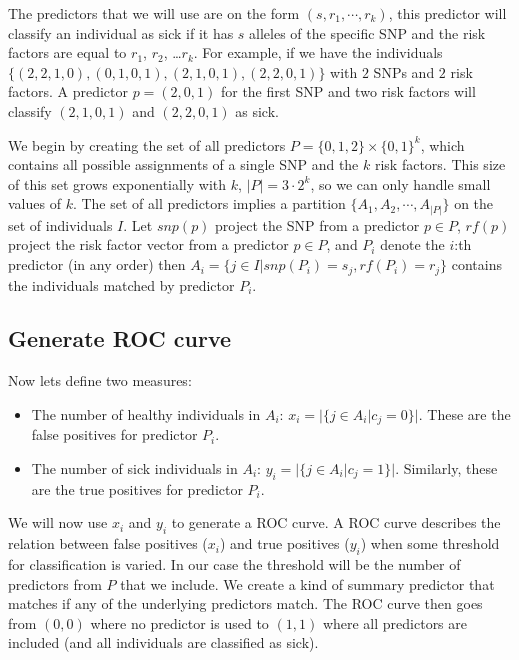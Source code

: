 \documentclass[a4paper]{article}
\begin{document}
The predictors that we will use are on the form $(s, r_1, \cdots, r_k)$, this predictor will classify an individual as sick if it has $s$ alleles of the specific SNP and the risk factors are equal to $r_1$, $r_2$, \ldots $r_k$. For example, if we have the individuals $\{(2,2,1,0),(0,1,0,1),(2,1,0,1),(2,2,0,1)\}$ with $2$ SNPs and $2$ risk factors. A predictor $p = (2,0,1)$ for the first SNP and two risk factors will classify $(2,1,0,1)$ and $(2,2,0,1)$ as sick.

We begin by creating the set of all predictors $P = \{0,1,2\}\times\{0,1\}^k$, which contains all possible assignments of a single SNP and the $k$ risk factors. This size of this set grows exponentially with $k$, $|P| = 3 \cdot 2^k$, so we can only handle small values of $k$. The set of all predictors implies a partition $\{A_1, A_2, \cdots, A_{|P|}\}$ on the set of individuals $I$. Let $snp(p)$ project the SNP from a predictor $p \in P$, $rf(p)$ project the risk factor vector from a predictor $p \in P$, and $P_i$ denote the $i$:th predictor (in any order) then $A_i = \{ j \in I | snp(P_i) = s_j, rf(P_i) = r_j \}$ contains the individuals matched by predictor $P_i$.
\subsection{Generate ROC curve}
Now lets define two measures:
\begin{itemize}
  \item The number of healthy individuals in $A_i$: $x_i = |\{j \in A_i | c_j = 0\}|$. These are the false positives for predictor $P_i$.
  \item The number of sick individuals in $A_i$: $y_i = |\{j \in A_i | c_j = 1\}|$. Similarly, these are the true positives for predictor $P_i$.
\end{itemize}
We will now use $x_i$ and $y_i$ to generate a ROC curve. A ROC curve describes the relation between false positives ($x_i$) and true positives ($y_i$) when some threshold for classification is varied. In our case the threshold will be the number of predictors from $P$ that we include. We create a kind of summary predictor that matches if any of the underlying predictors match. The ROC curve then goes from $(0,0)$ where no predictor is used to $(1,1)$ where all predictors are included (and all individuals are classified as sick).
\end{document}
